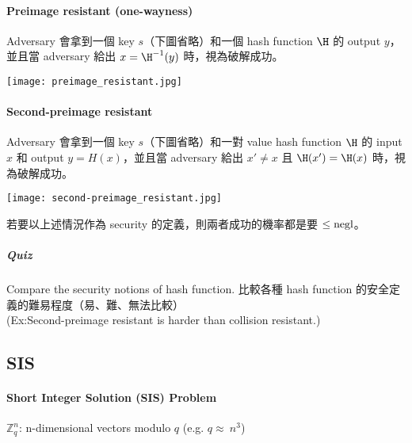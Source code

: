 \paragraph{Preimage resistant (one-wayness)}

Adversary 會拿到一個 key \(s\)（下圖省略）和一個 hash function \(\H\) 的 output \(y\)，並且當 adversary 給出 \(x = \H^{-1}(y)\) 時，視為破解成功。
\begin{center}
	\texttt{[image: preimage\_resistant.jpg]}
\end{center}

\paragraph{Second-preimage resistant}

Adversary 會拿到一個 key \(s\)（下圖省略）和一對 value \textemdash{} hash function \(\H\) 的 input \(x\) 和 output \(y = H(x)\)，並且當 adversary 給出 \(x' \neq x\) 且 \( \H(x') = \H(x)\) 時，視為破解成功。
\begin{center}
	\texttt{[image: second-preimage\_resistant.jpg]}
\end{center}

若要以上述情況作為 security 的定義，則兩者成功的機率都是要 \(\leq \operatorname{negl}\)。

\subparagraph{Quiz}

Compare the security notions of hash function. 比較各種 hash function 的安全定義的難易程度（易、難、無法比較） \\
(Ex:Second-preimage resistant is harder than collision resistant.)


\subsection{SIS}


\paragraph{Short Integer Solution (SIS) Problem}

\(\mathbb{Z}_q^n\): n-dimensional vectors modulo \(q\) (e.g. \(q \approx\ n^3\))

